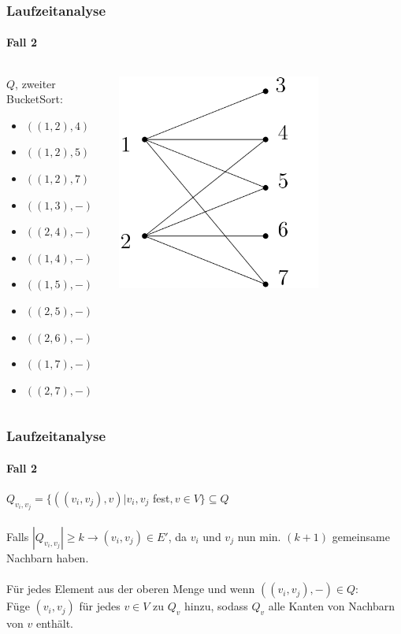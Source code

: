 \begin{frame}[t]
\frametitle{Laufzeitanalyse}
\framesubtitle{Fall 2}

\begin{columns}
	\begin{block}{$Q$, zweiter BucketSort:}
		\begin{itemize}
			\item $((1,2), 4)$
			\item $((1,2), 5)$
			\item $((1,2), 7)$
			\item $((1,3), -)$
			\item $((2,4), -)$
			\item $((1,4), -)$
			\item $((1,5), -)$
			\item $((2,5), -)$
			\item $((2,6), -)$
			\item $((1,7), -)$
			\item $((2,7), -)$
		\end{itemize}
	\end{block}
	
	\includegraphics[width=0.7\textwidth]{images/Graph_Queue_1.png}
\end{columns}
\end{frame}


\begin{frame}
\frametitle{Laufzeitanalyse}
\framesubtitle{Fall 2}

$Q_{v_i,v_j} = \{ ((v_i, v_j), v) | v_i, v_j$ fest$, v \in V \} \subseteq Q$ \\
\ \\
Falls $|Q_{v_i, v_j}| \geq k \rightarrow (v_i, v_j) \in E'$, da $v_i$ und $v_j$ nun min. $(k+1)$ gemeinsame Nachbarn haben. \\
\ \\
Für jedes Element aus der oberen Menge und wenn $((v_i, v_j), -) \in Q$: \\
Füge $(v_i, v_j)$ für jedes $v \in V$ zu $Q_v$ hinzu, sodass $Q_v$ alle Kanten von Nachbarn von $v$ enthält.\\
\end{frame}

